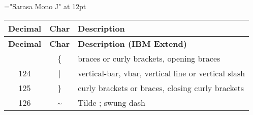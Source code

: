 {\font\rm="Sarasa Mono J" at 12pt \rm 
\begin{center}\begin{longtable}{|c|c|l|}
	\hline
	\textbf{Decimal} & \textbf{Char} & \textbf{Description} \\
	\hline\endfirsthead\hline
	\textbf{Decimal} & \textbf{Char} & \textbf{Description (IBM Extend)} \\
	\hline\endhead\hline\endfoot\hline\endlastfoot
123 & \{& braces or curly brackets, opening braces \\\hline
124 & | & vertical-bar, vbar, vertical line or vertical slash \\\hline
125 & \}& curly brackets or braces, closing curly brackets \\\hline
126 & \~& Tilde ; swung dash \\\hline
\end{longtable}\end{center}
}


